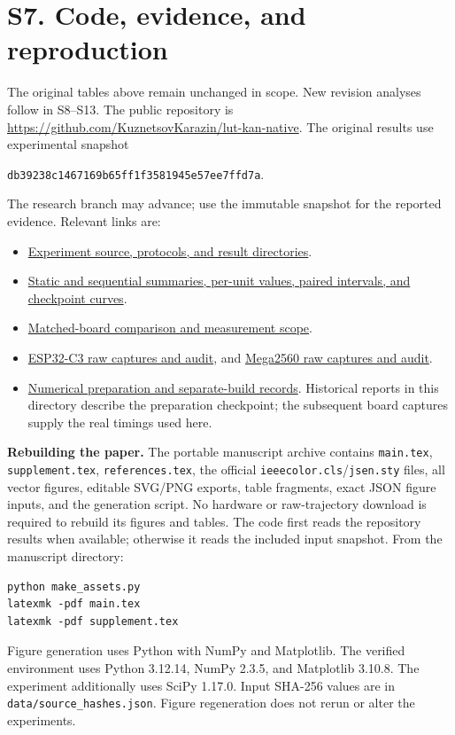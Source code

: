 \documentclass[10pt,letterpaper]{article}
\newcommand{\snap}{https://github.com/KuznetsovKarazin/lut-kan-native/tree/db39238c1467169b65ff1f3581945e57ee7ffd7a}
\begin{document}
\section*{S7. Code, evidence, and reproduction}
The original tables above remain unchanged in scope. New revision analyses follow in S8--S13. The public repository is \url{https://github.com/KuznetsovKarazin/lut-kan-native}. The original results use experimental snapshot
\begin{center}\texttt{db39238c1467169b65ff1f3581945e57ee7ffd7a}.\end{center}
The research branch may advance; use the immutable snapshot for the reported evidence. Relevant links are:
\begin{itemize}
\item \href{\snap/experiments/sensor_recovery}{Experiment source, protocols, and result directories}.
\item \href{\snap/experiments/sensor_recovery/results/matched_adaptation_20261108}{Static and sequential summaries, per-unit values, paired intervals, and checkpoint curves}.
\item \href{\snap/experiments/sensor_recovery/results/matched_boards_20261108}{Matched-board comparison and measurement scope}.
\item \href{\snap/experiments/sensor_recovery/results/c3_matched_20261108}{ESP32-C3 raw captures and audit}, and \href{\snap/experiments/sensor_recovery/results/mega_matched_20261108}{Mega2560 raw captures and audit}.
\item \href{\snap/experiments/sensor_recovery/results/matched_mcu_20261108}{Numerical preparation and separate-build records}. Historical reports in this directory describe the preparation checkpoint; the subsequent board captures supply the real timings used here.
\end{itemize}

\textbf{Rebuilding the paper.} The portable manuscript archive contains \texttt{main.tex}, \texttt{supplement.tex}, \texttt{references.tex}, the official \texttt{ieeecolor.cls}/\texttt{jsen.sty} files, all vector figures, editable SVG/PNG exports, table fragments, exact JSON figure inputs, and the generation script. No hardware or raw-trajectory download is required to rebuild its figures and tables. The code first reads the repository results when available; otherwise it reads the included input snapshot. From the manuscript directory:
\begin{lstlisting}
python make_assets.py
latexmk -pdf main.tex
latexmk -pdf supplement.tex
\end{lstlisting}
Figure generation uses Python with NumPy and Matplotlib. The verified environment uses Python 3.12.14, NumPy 2.3.5, and Matplotlib 3.10.8. The experiment additionally uses SciPy 1.17.0. Input SHA-256 values are in \texttt{data/source\_hashes.json}. Figure regeneration does not rerun or alter the experiments.
\end{document}
